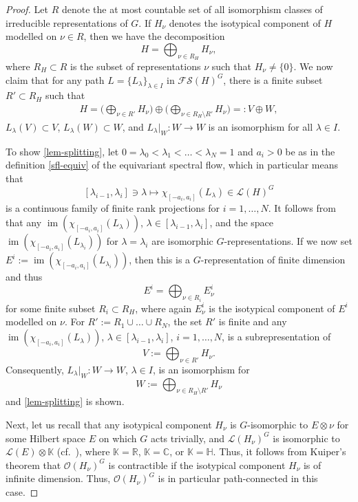 \documentclass[pdftex]{sigma}
\numberwithin{equation}{section}
\theoremstyle{definition}
\DeclareMathOperator{\im}{im}
\begin{document}
\begin{proof}
Let $R$ denote the at most countable set of all isomorphism classes of irreducible representations of $G$. If $H_\nu$ denotes the isotypical component of $H$ modelled on $\nu\in R$, then we have the decomposition
\[H=\bigoplus_{\nu\in R_H}H_\nu,\]
where $R_H\subset R$ is the subset of representations $\nu$ such that $H_\nu\neq\{0\}$. We now claim that for any path $L=\{L_\lambda\}_{\lambda\in I}$ in $\mathcal{FS}(H)^G$, there is a finite subset $R'\subset R_H$ such that
\begin{align}\label{lem-splitting}
H=\Biggl(\bigoplus_{\nu\in R'}H_\nu\Biggr)\oplus\Biggl(\bigoplus_{\nu\in R_H\setminus R'}H_\nu\Biggr)=:V\oplus W,
\end{align}
$L_\lambda(V)\subset V$, $L_\lambda(W)\subset W$, and $L_\lambda|_W \colon W\rightarrow W$ is an isomorphism for all $\lambda\in I$.

To show \eqref{lem-splitting}, let $0=\lambda_0<\lambda_1<\dots<\lambda_N=1$ and $a_i>0$ be as in the definition \eqref{sfl-equiv} of the equivariant spectral flow, which in particular means that
\[[\lambda_{i-1},\lambda_i]\ni\lambda\mapsto\chi_{[-a_i,a_i]}(L_\lambda)\in\mathcal{L}(H)^G\]
is a continuous family of finite rank projections for $i=1,\dots,N$. It follows from \cite[Lemma~2.2]{MJN21} that any $\im(\chi_{[-a_i,a_i]}(L_\lambda))$, $\lambda\in[\lambda_{i-1},\lambda_i]$, and the space $\im(\chi_{[-a_i,a_i]}(L_{\lambda_i}))$ for $\lambda=\lambda_i$ are isomorphic $G$-representations. If we now set $E^i:=\im(\chi_{[-a_i,a_i]}(L_{\lambda_i}))$, then this is a $G$\nobreakdash-rep\-re\-sen\-ta\-tion of finite dimension and thus
\[E^i=\bigoplus_{\nu\in R_i}E^i_\nu\]
for some finite subset $R_i\subset R_H$, where again $E^i_\nu$ is the isotypical component of $E^i$ modelled on $\nu$. For $R':=R_1\cup\dots\cup R_N$, the set $R'$ is finite and any $\im(\chi_{[-a_i,a_i]}(L_{\lambda}))$, $\lambda\in[\lambda_{i-1},\lambda_i]$, $i=1,\dots,N$, is a subrepresentation of
\[V:=\bigoplus_{\nu\in R'}H_\nu.\]
Consequently, $L_\lambda|_W \colon W\rightarrow W$, $\lambda\in I$, is an isomorphism for
\[W:=\bigoplus_{\nu\in R_H\setminus R'}H_\nu\]
and \eqref{lem-splitting} is shown.

Next, let us recall that any isotypical component $H_\nu$ is $G$-isomorphic to $E\otimes \nu$ for some Hilbert space $E$ on which $G$ acts trivially, and $\mathcal{L}(H_\nu)^G$ is isomorphic to $\mathcal{L}(E)\otimes\mathbb{K}$ (cf.\ \cite{Broecker}), where $\mathbb{K}=\mathbb{R}$, $\mathbb{K}=\mathbb{C}$, or $\mathbb{K}=\mathbb{H}$. Thus, it follows from Kuiper's theorem that $\mathcal{O}(H_\nu)^G$ is contractible if the isotypical component $H_\nu$ is of infinite dimension. Thus, $\mathcal{O}(H_\nu)^G$ is in particular path-connected in this case.


\end{proof}
\end{document}
